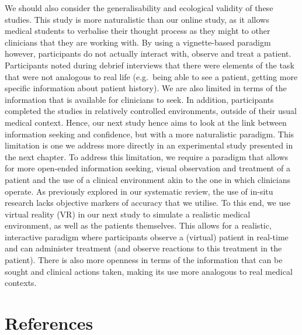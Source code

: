 \documentclass[a4paper, nobind]{templates/ociamthesis}
\begin{document}
We should also consider the generalisability and ecological validity of these studies. This study is more naturalistic than our online study, as it allows medical students to verbalise their thought process as they might to other clinicians that they are working with. By using a vignette-based paradigm however, participants do not actually interact with, observe and treat a patient. Participants noted during debrief interviews that there were elements of the task that were not analogous to real life (e.g.~being able to see a patient, getting more specific information about patient history). We are also limited in terms of the information that is available for clinicians to seek. In addition, participants completed the studies in relatively controlled environments, outside of their usual medical context. Hence, our next study hence aims to look at the link between information seeking and confidence, but with a more naturalistic paradigm. This limitation is one we address more directly in an experimental study presented in the next chapter. To address this limitation, we require a paradigm that allows for more open-ended information seeking, visual observation and treatment of a patient and the use of a clinical environment akin to the one in which clinicians operate. As previously explored in our systematic review, the use of in-situ research lacks objective markers of accuracy that we utilise. To this end, we use virtual reality (VR) in our next study to simulate a realistic medical environment, as well as the patients themselves. This allows for a realistic, interactive paradigm where participants observe a (virtual) patient in real-time and can administer treatment (and observe reactions to this treatment in the patient). There is also more openness in terms of the information that can be sought and clinical actions taken, making its use more analogous to real medical contexts.

\chapter*{References}\label{references}


\setlength{\baselineskip}{0pt} %

{\renewcommand*\MakeUppercase[1]{#1}%
\printbibliography[heading=none]}
\end{document}
